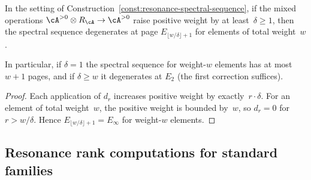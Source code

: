 \begin{proposition}
\label{prop:resonance-ss-degeneration}
In the setting of
Construction~\textup{\ref{const:resonance-spectral-sequence}},
if the mixed operations
$\cA^{>0} \otimes R_\cA \to \cA^{>0}$ raise positive weight
by at least~$\delta \ge 1$, then the spectral sequence
degenerates at page $E_{\lfloor w/\delta \rfloor + 1}$ for
elements of total weight~$w$.

In particular, if $\delta = 1$ the spectral sequence for
weight-$w$ elements has at most $w+1$ pages, and if
$\delta \ge w$ it degenerates at $E_2$
\textup{(}the first correction suffices\textup{)}.
\end{proposition}

\begin{proof}
Each application of $d_r$ increases positive weight by
exactly~$r \cdot \delta$.  For an element of total weight~$w$,
the positive weight is bounded by~$w$, so $d_r = 0$ for
$r > w/\delta$.  Hence $E_{\lfloor w/\delta \rfloor + 1}
= E_\infty$ for weight-$w$ elements.
\end{proof}

\subsection{Resonance rank computations for standard families}


